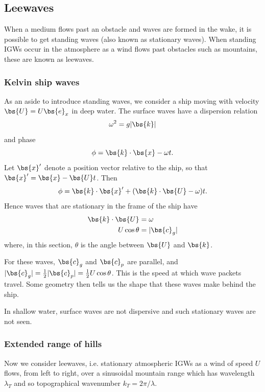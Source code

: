 \subsection{Leewaves}

When a medium flows past an obstacle and waves are formed in the wake, it is possible to get standing waves (also known as stationary waves). When standing IGWs occur in the atmosphere as a wind flows past obstacles such as mountains, these are known as leewaves.

\subsubsection{Kelvin ship waves}

As an aside to introduce standing waves, we consider a ship moving with velocity $\bs{U} = U\bs{e}_x$ in deep water. The surface waves have a dispersion relation
\begin{equation}
\omega^2 = g|\bs{k}|
\end{equation}
and phase
\begin{equation}
	\phi = \bs{k}\cdot\bs{x} - \omega t.
\end{equation}
Let $\bs{x}'$ denote a position vector relative to the ship, so that $\bs{x}' = \bs{x} - \bs{U}t$. Then
\begin{equation}
	\phi = \bs{k}\cdot\bs{x}' + (\bs{k}\cdot\bs{U} - \omega) t.
\end{equation}
Hence waves that are stationary in the frame of the ship have
\begin{align}
	\bs{k}\cdot\bs{U} &= \omega \\
	U\cos\theta &= |\bs{c}_g|
\end{align}
where, in this section, $\theta$ is the angle between $\bs{U}$ and $\bs{k}$. 

For these waves, $\bs{c}_g$ and $\bs{c}_p$ are parallel, and $|\bs{c}_g| = \frac{1}{2} |\bs{c}_p| = \frac{1}{2}U\cos\theta$. This is the speed at which wave packets travel. Some geometry then tells us the shape that these waves make behind the ship.

In shallow water, surface waves are not dispersive and such stationary waves are not seen.

\subsubsection{Extended range of hills}

Now we consider leewaves, i.e. stationary atmospheric IGWs as a wind of speed $U$ flows, from left to right, over a sinusoidal mountain range which has wavelength $\lambda_T$ and so topographical wavenumber $k_T = 2\pi/\lambda$. 

